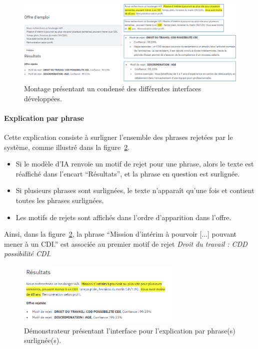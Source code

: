\begin{figure}[htpb!]
    \includegraphics[width=\textwidth]{./S2-Explicabilite_locale/figures/explications_locales.png}
    \caption{Montage présentant un condensé des différentes interfaces développées.}
    \label{fig:explications_locales}
\end{figure}

\paragraph{Explication par phrase} Cette explication consiste à surligner l'ensemble des phrases rejetées par le système, comme illustré dans la figure~\ref{fig:demo_phrase}.
\begin{itemize}
    \item Si le modèle d'IA renvoie un motif de rejet pour une phrase, alors le texte est réaffiché dans l'encart ``Résultats'', et la phrase en question est surlignée.
    \item Si plusieurs phrases sont surlignées, le texte n'apparaît qu'une fois et contient toutes les phrases surlignées.
    \item Les motifs de rejets sont affichés dans l'ordre d'apparition dans l'offre.
\end{itemize}
Ainsi, dans la figure~\ref{fig:demo_phrase}, la phrase ``Mission d'intérim à pourvoir [...] pouvant mener à un CDI.'' est associée au premier motif de rejet \textit{Droit du travail : CDD possibilité CDI}.

\begin{figure}[htpb!]
 \centering
 \includegraphics[width=0.7\textwidth]{S2-Explicabilite_locale/figures/demo_phrase.png}
 \caption{Démonstrateur présentant l'interface pour l'explication par phrase(s) surlignée(s).}
 \label{fig:demo_phrase}
\end{figure}

